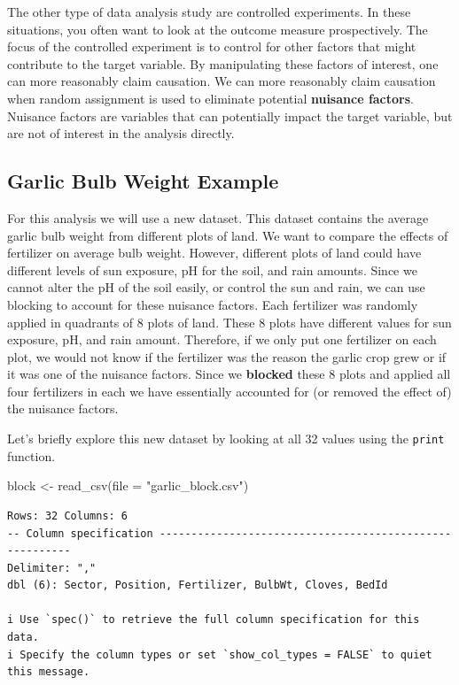 \documentclass[
  letterpaper,
  DIV=11,
  numbers=noendperiod]{scrreprt}
\newenvironment{Shaded}{\begin{snugshade}}{\end{snugshade}}
\newcommand{\AttributeTok}[1]{\textcolor[rgb]{0.40,0.45,0.13}{#1}}
\newcommand{\FunctionTok}[1]{\textcolor[rgb]{0.28,0.35,0.67}{#1}}
\newcommand{\NormalTok}[1]{\textcolor[rgb]{0.00,0.23,0.31}{#1}}
\newcommand{\OtherTok}[1]{\textcolor[rgb]{0.00,0.23,0.31}{#1}}
\newcommand{\StringTok}[1]{\textcolor[rgb]{0.13,0.47,0.30}{#1}}
\begin{document}
The other type of data analysis study are controlled experiments. In
these situations, you often want to look at the outcome measure
prospectively. The focus of the controlled experiment is to control for
other factors that might contribute to the target variable. By
manipulating these factors of interest, one can more reasonably claim
causation. We can more reasonably claim causation when random assignment
is used to eliminate potential \textbf{nuisance factors}. Nuisance
factors are variables that can potentially impact the target variable,
but are not of interest in the analysis directly.

\hypertarget{garlic-bulb-weight-example}{%
\subsection{Garlic Bulb Weight
Example}\label{garlic-bulb-weight-example}}

For this analysis we will use a new dataset. This dataset contains the
average garlic bulb weight from different plots of land. We want to
compare the effects of fertilizer on average bulb weight. However,
different plots of land could have different levels of sun exposure, pH
for the soil, and rain amounts. Since we cannot alter the pH of the soil
easily, or control the sun and rain, we can use blocking to account for
these nuisance factors. Each fertilizer was randomly applied in
quadrants of 8 plots of land. These 8 plots have different values for
sun exposure, pH, and rain amount. Therefore, if we only put one
fertilizer on each plot, we would not know if the fertilizer was the
reason the garlic crop grew or if it was one of the nuisance factors.
Since we \textbf{blocked} these 8 plots and applied all four fertilizers
in each we have essentially accounted for (or removed the effect of) the
nuisance factors.

Let's briefly explore this new dataset by looking at all 32 values using
the \texttt{print} function.

\begin{Shaded}
\begin{Highlighting}[]
\NormalTok{block }\OtherTok{\textless{}{-}} \FunctionTok{read\_csv}\NormalTok{(}\AttributeTok{file =} \StringTok{"garlic\_block.csv"}\NormalTok{)}
\end{Highlighting}
\end{Shaded}

\begin{verbatim}
Rows: 32 Columns: 6
-- Column specification --------------------------------------------------------
Delimiter: ","
dbl (6): Sector, Position, Fertilizer, BulbWt, Cloves, BedId

i Use `spec()` to retrieve the full column specification for this data.
i Specify the column types or set `show_col_types = FALSE` to quiet this message.
\end{verbatim}
\end{document}
